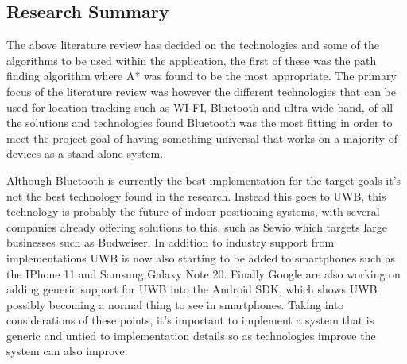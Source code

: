 \subsection{Research Summary}
The above literature review has decided on the technologies and some of the algorithms to be used within the application, the first of these was the path finding algorithm where A* was found to be the most appropriate. The primary focus of the literature review was however the different technologies that can be used for location tracking such as WI-FI, Bluetooth and ultra-wide band, of all the solutions and technologies found Bluetooth was the most fitting in order to meet the project goal of having something universal that works on a majority of devices as a stand alone system.

Although Bluetooth is currently the best implementation for the target goals it’s not the best technology found in the research. Instead this goes to UWB, this technology is probably the future of indoor positioning systems, with several companies already offering solutions to this, such as Sewio which targets large businesses such as Budweiser. In addition to industry support from implementations UWB is now also starting to be added to smartphones such  as the IPhone 11 and Samsung Galaxy Note 20. Finally Google are also working on adding generic support for UWB into the Android SDK, which shows UWB possibly becoming a normal thing to see in smartphones. Taking into considerations of these points, it’s important to implement a system that is generic and untied to implementation details so as technologies improve the system can also improve.
